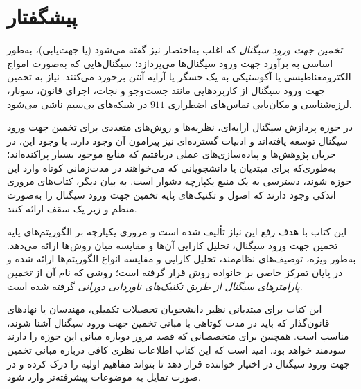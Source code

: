 
\chapter*{پیشگفتار}

\textit{تخمین جهت ورود سیگنال} که اغلب به‌اختصار  نیز گفته می‌شود (یا جهت‌یابی)، به‌طور اساسی به برآورد جهت ورود سیگنال‌ها می‌پردازد؛ سیگنال‌هایی که به‌صورت امواج الکترومغناطیسی یا آکوستیکی به یک حسگر یا آرایه آنتن برخورد می‌کنند. نیاز به تخمین جهت ورود سیگنال از کاربردهایی مانند جست‌وجو و نجات، اجرای قانون، سونار، لرزه‌شناسی و مکان‌یابی تماس‌های اضطراری $911$ در شبکه‌های بی‌سیم ناشی می‌شود.

در حوزه پردازش سیگنال آرایه‌ای، نظریه‌ها و روش‌های متعددی برای تخمین جهت ورود سیگنال توسعه یافته‌اند و ادبیات گسترده‌ای نیز پیرامون آن وجود دارد. با وجود این، در جریان پژوهش‌ها و پیاده‌سازی‌های عملی دریافتیم که منابع موجود بسیار پراکنده‌اند؛ به‌طوری‌که برای مبتدیان یا دانشجویانی که می‌خواهند در مدت‌زمانی کوتاه وارد این حوزه شوند، دسترسی به یک منبع یکپارچه دشوار است. به بیان دیگر، کتاب‌های مروری اندکی وجود دارند که اصول و تکنیک‌های پایه تخمین جهت ورود سیگنال را به‌صورت منظم و زیر یک سقف ارائه کنند.

این کتاب با هدف رفع این نیاز تألیف شده است و مروری یکپارچه بر الگوریتم‌های پایه تخمین جهت ورود سیگنال، تحلیل کارایی آن‌ها و مقایسه میان روش‌ها ارائه می‌دهد. به‌طور ویژه، توصیف‌های نظام‌مند، تحلیل کارایی و مقایسه انواع الگوریتم‌ها ارائه شده و در پایان تمرکز خاصی بر خانواده روش  قرار گرفته است؛ روشی که نام آن از \textit{تخمین پارامترهای سیگنال از طریق تکنیک‌های ناوردایی دورانی} گرفته شده است.

این کتاب برای مبتدیانی نظیر دانشجویان تحصیلات تکمیلی، مهندسان یا نهادهای قانون‌گذار که باید در مدت کوتاهی با مبانی تخمین جهت ورود سیگنال آشنا شوند، مناسب است. همچنین برای متخصصانی که قصد مرور دوباره مبانی این حوزه را دارند سودمند خواهد بود. امید است که این کتاب اطلاعات نظری کافی درباره مبانی تخمین جهت ورود سیگنال در اختیار خواننده قرار دهد تا بتواند مفاهیم اولیه را درک کرده و در صورت تمایل به موضوعات پیشرفته‌تر وارد شود.






